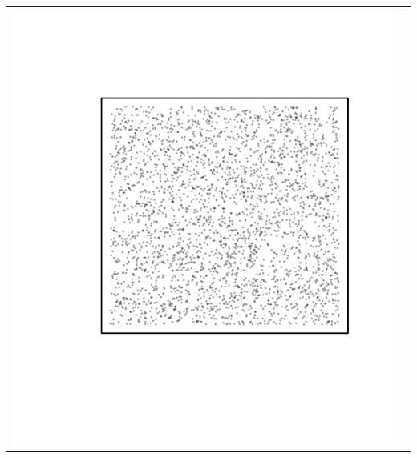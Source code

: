 \documentclass{article}\usepackage{graphicx, color}
\makeatletter
\def\maxwidth{ %
  \ifdim\Gin@nat@width>\linewidth
    \linewidth
  \else
    \Gin@nat@width
  \fi
}
\newenvironment{knitrout}{}{} %
\makeatother
\begin{document}
\vspace*{-1.75in}
\begin{tabular}{cc}
\begin{knitrout}
\definecolor{shadecolor}{rgb}{0.969, 0.969, 0.969}\color{fgcolor}\includegraphics[width=\maxwidth]{figure/unnamed-chunk-21} 
\end{knitrout}


\end{tabular}
\end{document}
